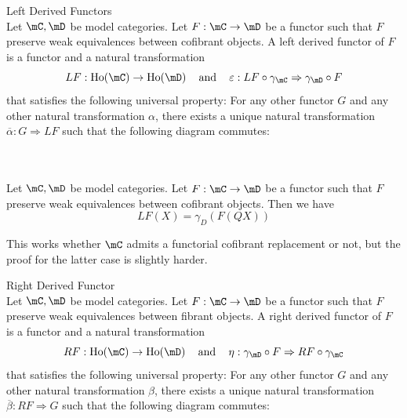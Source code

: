 \documentclass[a4paper]{article}
\begin{document}
\begin{defn}{Left Derived Functors}{}\\
Let $\mC,\mD$ be model categories. Let $F:\mC\to\mD$ be a functor such that $F$ preserve weak equivalences between cofibrant objects. A left derived functor of $F$ is a functor and a natural transformation $$LF:\text{Ho}(\mC)\to\text{Ho}(\mD)\;\;\;\text{ and }\;\;\;\varepsilon:LF\circ\gamma_\mC\Rightarrow\gamma_\mD\circ F$$ that satisfies the following universal property: For any other functor $G$ and any other natural transformation $\alpha$, there exists a unique natural transformation $\overline{\alpha}:G\Rightarrow LF$ such that the following diagram commutes: \\
\\
\end{defn}

\begin{prp}{}{}\\
Let $\mC,\mD$ be model categories. Let $F:\mC\to\mD$ be a functor such that $F$ preserve weak equivalences between cofibrant objects. Then we have $$LF(X)=\gamma_D(F(QX))$$
\end{prp}

This works whether $\mC$ admits a functorial cofibrant replacement or not, but the proof for the latter case is slightly harder. 

\begin{defn}{Right Derived Functor}{}\\
Let $\mC,\mD$ be model categories. Let $F:\mC\to\mD$ be a functor such that $F$ preserve weak equivalences between fibrant objects. A right derived functor of $F$ is a functor and a natural transformation $$RF:\text{Ho}(\mC)\to\text{Ho}(\mD)\;\;\;\text{ and }\;\;\;\eta:\gamma_\mD\circ F\Rightarrow RF\circ\gamma_\mC$$ that satisfies the following universal property: For any other functor $G$ and any other natural transformation $\beta$, there exists a unique natural transformation $\overline{\beta}:RF\Rightarrow G$ such that the following diagram commutes: \\
\\
\end{defn}
\end{document}
